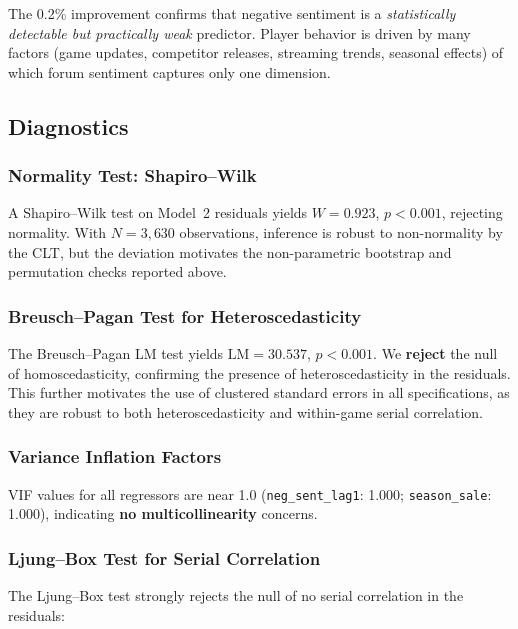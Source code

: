 \documentclass[11pt, letterpaper]{article}
\begin{document}
The 0.2\% improvement confirms that negative sentiment is a \emph{statistically detectable but practically weak} predictor.
Player behavior is driven by many factors (game updates, competitor releases, streaming trends, seasonal effects) of which forum sentiment captures only one dimension.

\subsection{Diagnostics}\label{sec:diagnostics}

\subsubsection{Normality Test: Shapiro--Wilk}

A Shapiro--Wilk test on Model~2 residuals yields $W = 0.923$, $p < 0.001$, rejecting normality.
With $N = 3{,}630$ observations, inference is robust to non-normality by the CLT, but the deviation motivates the non-parametric bootstrap and permutation checks reported above.

\subsubsection{Breusch--Pagan Test for Heteroscedasticity}

The Breusch--Pagan LM test yields $\text{LM} = 30.537$, $p < 0.001$.
We \textbf{reject} the null of homoscedasticity, confirming the presence of heteroscedasticity in the residuals.
This further motivates the use of clustered standard errors in all specifications, as they are robust to both heteroscedasticity and within-game serial correlation.

\subsubsection{Variance Inflation Factors}

VIF values for all regressors are near 1.0 (\texttt{neg\_sent\_lag1}: 1.000; \texttt{season\_sale}: 1.000), indicating \textbf{no multicollinearity} concerns.

\subsubsection{Ljung--Box Test for Serial Correlation}

The Ljung--Box test strongly rejects the null of no serial correlation in the residuals:
\end{document}
